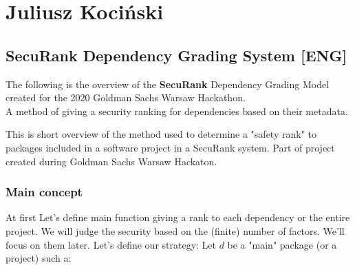 \newtheorem{uwaga}{Uwaga}

\newtheorem{lemma}{Lemma}
\newtheorem{deff}{Definition}

\section{Juliusz Kociński}
\subsection{SecuRank Dependency Grading System [ENG]}
\begin{center}
The following is the overview of the \textbf{SecuRank }Dependency Grading Model created for the 2020 Goldman Sachs Warsaw Hackathon.\\ 
\large A method of giving a security ranking for dependencies based on their metadata.
\\

\normalsize

    This is short overview of the method used to determine a "safety rank" to packages included in a software project in a SecuRank system.
    Part of project created during Goldman Sachs Warsaw Hackaton.
\end{center}

\hline

\normalsize

\subsubsection{Main concept}
At first Let's define main function giving a rank to each dependency or the entire project. We will judge the security based on the (finite) number of factors. We'll focus on them later. Let's define our strategy:
Let $d$ be a "main" package (or a project) such a:

